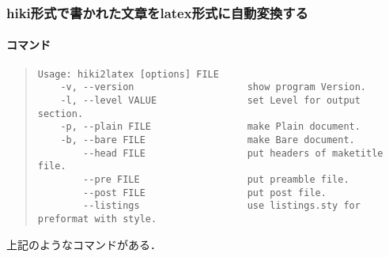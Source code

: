 \subsubsection{hiki形式で書かれた文章をlatex形式に自動変換する}
\paragraph{コマンド}\begin{quote}\begin{verbatim}
Usage: hiki2latex [options] FILE
    -v, --version                    show program Version.
    -l, --level VALUE                set Level for output section.
    -p, --plain FILE                 make Plain document.
    -b, --bare FILE                  make Bare document.
        --head FILE                  put headers of maketitle file.
        --pre FILE                   put preamble file.
        --post FILE                  put post file.
        --listings                   use listings.sty for preformat with style.
\end{verbatim}\end{quote}
上記のようなコマンドがある．

